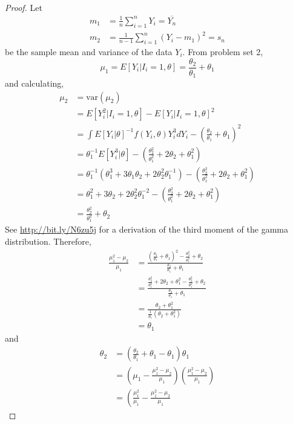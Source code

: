 \documentclass[letterpaper, 12pt]{article}\usepackage[]{graphicx}\usepackage[]{color}
\newcommand{\var}{\text{var}}
\begin{document}
\begin{proof}
Let 
\begin{align*}
m_1 &= \frac{1}{n} \sum_{i=1}^n Y_i = \overline{Y_n} \\
m_2 &= \frac{1}{n-1} \sum_{i=1}^n (Y_i-m_1)^2 = s_n
\end{align*}
be the sample mean and variance of the data $Y_i$. From problem set 2,
\[
\mu_1 = E[Y_i|I_i=1, \theta] = \frac{\theta_2}{\theta_1} + \theta_1
\]
and calculating,
\begin{align*}
\mu_2 
&=
\var(\mu_2)
\\
&=
E[Y_i^2 | I_i=1, \theta] - E[Y_i | I_i=1, \theta]^2
\\
&= 
\int E[Y_i | \theta]^{-1}f(Y_i, \theta)Y_i^3 dY_i
- 
\left(
\frac{\theta_2}{\theta_1} + \theta_1
\right)^2
\\
&=
\theta_1^{-1}E[Y_i^3 | \theta]
-
\left(
\frac{\theta_2^2}{\theta_1^2} + 2\theta_2 + \theta_1^2
\right)
\\
&=
\theta_1^{-1}
\left(
\theta_1^3 + 3\theta_1\theta_2 + 2 \theta_2^2\theta_1^{-1}
\right)
-
\left(
\frac{\theta_2^2}{\theta_1^2} + 2\theta_2 + \theta_1^2
\right)
\\
&=
\theta_1^2 +3\theta_2 +2\theta^2_2\theta_1^{-2}
-
\left(
\frac{\theta_2^2}{\theta_1^2} + 2\theta_2 + \theta_1^2
\right)
\\
&=
\frac{\theta_2^2}{\theta_1^2} + \theta_2
\end{align*}
See \url{http://bit.ly/N6zu5j} for a derivation of the third moment of the gamma distribution. Therefore,
\begin{align*}
\frac{\mu_1^2 - \mu_2}{\mu_1}
&=
\frac{
\left(
\frac{\theta_2}{\theta_1} + \theta_1
\right)^2
-
\frac{\theta_2^2}{\theta_1^2} + \theta_2
}{
\frac{\theta_2}{\theta_1} + \theta_1
}
\\
&=
\frac{
\frac{\theta_2^2}{\theta_1^2} + 2\theta_2 + \theta_1^2
-
\frac{\theta_2^2}{\theta_1^2} + \theta_2
}{
\frac{\theta_2}{\theta_1} + \theta_1
}
\\
&=
\frac{
\theta_2 + \theta_1^2
}{
\frac{1}{\theta_1}
(\theta_2 + \theta_1^2)
}
\\
&=
\theta_1
\end{align*}
and
\begin{align*}
\theta_2 
&=
\left(
\frac{\theta_2}{\theta_1} + \theta_1
-\theta_1
\right)
\theta_1
\\
&=
\left(
\mu_1 -
\frac{\mu_1^2 - \mu_2}{\mu_1}
\right)
\left(
\frac{\mu_1^2 - \mu_2}{\mu_1}
\right)
\\
&=
\left(
\frac{\mu_1^2}{\mu_1} -
\frac{\mu_1^2 - \mu_2}{\mu_1}

\end{align*}
\end{proof}
\end{document}
